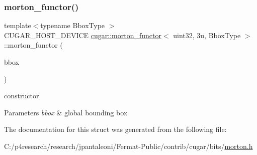 \subsubsection{\texorpdfstring{morton\+\_\+functor()}{morton\_functor()}}
{\footnotesize\ttfamily template$<$typename Bbox\+Type $>$ \\
C\+U\+G\+A\+R\+\_\+\+H\+O\+S\+T\+\_\+\+D\+E\+V\+I\+CE \hyperlink{structcugar_1_1morton__functor}{cugar\+::morton\+\_\+functor}$<$ uint32, 3u, Bbox\+Type $>$\+::morton\+\_\+functor (\begin{DoxyParamCaption}\item[{const Bbox\+Type \&}]{bbox }\end{DoxyParamCaption})\hspace{0.3cm}{\ttfamily [inline]}}

constructor


\begin{DoxyParams}{Parameters}
{\em bbox} & global bounding box \\
\hline
\end{DoxyParams}


The documentation for this struct was generated from the following file\+:\begin{DoxyCompactItemize}
\item 
C\+:/p4research/research/jpantaleoni/\+Fermat-\/\+Public/contrib/cugar/bits/\hyperlink{morton_8h}{morton.\+h}\end{DoxyCompactItemize}
